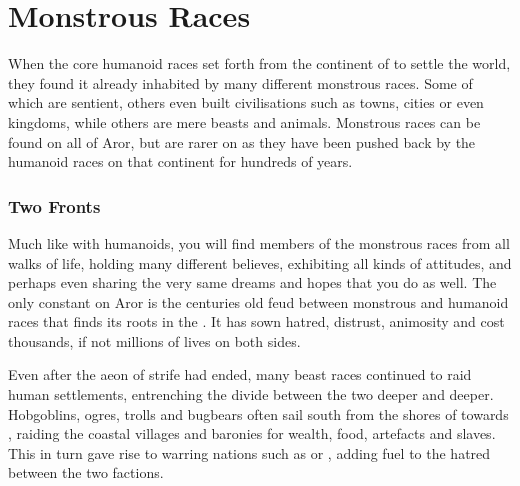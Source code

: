 











\section{Monstrous Races}
\label{sec:Monstrous Races}


When the core humanoid races set forth from the continent
of  to settle the world, they found it already inhabited
by many different monstrous races. Some of which are sentient, others even
built civilisations such as towns, cities or even kingdoms, while others are
mere beasts and animals. Monstrous races can be found on all of Aror, but are
rarer on  as they have been pushed back by the
humanoid races on that continent for hundreds of years.

\subsubsection{Two Fronts}

Much like with humanoids, you will find members of the monstrous races from
all walks of life, holding many different believes, exhibiting all kinds of
attitudes, and perhaps even sharing the very same dreams and hopes that you do
as well. The only constant on Aror is the centuries old feud between monstrous
and humanoid races that finds its roots in the . It has sown hatred, distrust, animosity and cost thousands, if not
millions of lives on both sides.

Even after the aeon of strife had ended, many beast races continued to raid
human settlements, entrenching the divide between the two deeper and deeper.
Hobgoblins, ogres, trolls and bugbears often sail south from the shores of
 towards , raiding the coastal
villages and baronies for wealth, food, artefacts and slaves. This in turn
gave rise to warring nations such as  or
, adding fuel to the hatred between the two factions.

